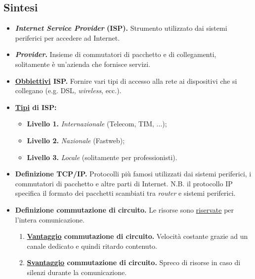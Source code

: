 \documentclass[a4paper]{article}
\begin{document}
	\newpage
	
	\subsection{Sintesi}
	
	\begin{itemize}[label=]
		\item \textbf{\emph{Internet Service Provider} (ISP).} Strumento utilizzato dai sistemi periferici per accedere ad Internet.
		
		\item \textbf{\emph{Provider}.} Insieme di commutatori di pacchetto e di collegamenti, solitamente è un'azienda che fornisce servizi.
		
		\item \textbf{\underline{Obbiettivi} ISP.} Fornire vari tipi di accesso alla rete ai dispositivi che si collegano (e.g. DSL, \emph{wireless}, ecc.).
		
		\item \textbf{\underline{Tipi} di ISP:}
			\begin{itemize}
				\item{\textbf{Livello 1.}} \emph{Internazionale} (Telecom, TIM, ...);
				\item{\textbf{Livello 2.}} \emph{Nazionale} (Fastweb);
				\item{\textbf{Livello 3.}} \emph{Locale} (solitamente per professionisti).
			\end{itemize}
		
		\item \textbf{Definizione TCP/IP.} Protocolli più famosi utilizzati dai sistemi periferici, i commutatori di pacchetto e altre parti di Internet. N.B. il protocollo IP specifica il formato dei pacchetti scambiati tra \emph{router} e sistemi periferici.
		
		\item \textbf{Definizione commutazione di circuito.}  Le risorse sono \underline{riservate} per l'intera comunicazione.
		
		\begin{enumerate}[label=\ding{43}]
			\item \textbf{\underline{Vantaggio} commutazione di circuito.} Velocità costante grazie ad un canale dedicato e quindi ritardo contenuto.
			
			\item \textbf{\underline{Svantaggio} commutazione di circuito.} Spreco di risorse in caso di silenzi durante la comunicazione.
			

\end{enumerate}
\end{itemize}
\end{document}
